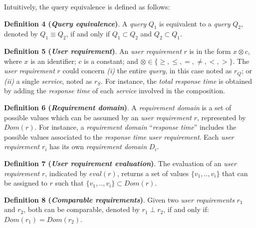 \bigskip
Intuitively, the query equivalence is defined as follows:

\bigskip
\noindent \textbf{Definition 4 (\textsl{Query equivalence})}.
A \textsl{query} $Q_{1}$ is equivalent to a \textsl{query} $Q_{2}$, denoted by $Q_{1} \equiv Q_{2}$, if and only if $Q_{1} \subset Q_{2}$ and $Q_{2} \subset Q_{1}$.
%

\bigskip
\noindent \textbf{Definition 5 (\textsl{User requirement})}.
An \textsl{user requirement} $r$ is in the form $x \otimes c$, where $x$ is an identifier; $c$ is a constant; and $\otimes \in\lbrace \geq, \leq, =, \neq, <, >\rbrace$. 
%
The \textsl{user requirement} $r$ could concern \textit{(i)} the entire \textsl{query}, in this case noted as $r_{Q}$; or \textit{(ii)} a single \textsl{service}, noted as $r_{S}$. For instance, the \textsl{total response time} is obtained by adding the \textsl{response time} of each \textsl{service} involved in the composition.

\bigskip
\noindent \textbf{Definition 6 (\textsl{Requirement domain})}. A \textsl{requirement domain} is a set of possible values which can be assumed by an \textsl{user requirement} $r$, represented by $Dom(r)$. For instance, a \textsl{requirement domain} ``\textit{response time}'' includes the possible values associated to the \textit{response time} \textsl{user requirement}. Each \textsl{user requirement} $r_{i}$ has its own \textsl{requirement domain} $D_{i}$. 

\bigskip
\noindent \textbf{Definition 7 (\textsl{User requirement evaluation})}. The evaluation of an \textsl{user requirement} $r$, indicated by $eval(r)$, returns a set of values $\lbrace v_{1},..,v_{i} \rbrace$ that can be assigned to $r$ such that $\lbrace v_{1},..,v_{i} \rbrace \subset Dom(r)$.

\bigskip
\noindent \textbf{Definition 8 (\textsl{Comparable requirements})}. Given two \textsl{user requirements} $r_{1}$ and $r_{2}$, both can be comparable, denoted by $r_{1} \perp r_{2}$, if and only if:  $Dom(r_{1}) = Dom(r_{2})$.


